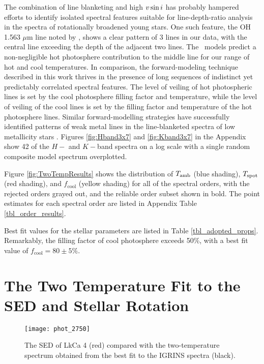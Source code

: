 \documentclass[twocolumn]{emulateapj}%
\begin{document}
The combination of line blanketing and high $v \sin i$ has probably hampered efforts to identify isolated spectral features suitable for line-depth-ratio analysis in the spectra of rotationally broadened young stars.  One such feature, the OH 1.563 $\mu$m line noted by \citet{oneal01}, shows a clear pattern of 3 lines in our data, with the central line exceeding the depth of the adjacent two lines.  The \PHOENIX\ models predict a non-negligible hot photosphere contribution to the middle line for our range of hot and cool temperatures.  In comparison, the forward-modeling technique described in this work thrives in the presence of long sequences of indistinct yet predictably correlated spectral features.  The level of veiling of hot photospheric lines is set by the cool photosphere filling factor and temperature, while the level of veiling of the cool lines is set by the filling factor and temperature of the hot photosphere lines. Similar forward-modelling strategies have successfully identified patterns of weak metal lines in the line-blanketed spectra of low metallicity stars \citep{kirby11,kirby15}.  Figures \ref{fig:Hband3x7} and \ref{fig:Kband3x7} in the Appendix show 42 of the $H-$ and $K-$band spectra on a log scale with a single random composite model spectrum overplotted.  

Figure \ref{fig:TwoTempResults} shows the distribution of $T_\textrm{amb}$ (blue shading), $T_\textrm{spot}$ (red shading), and $f_{\mathrm{cool}}$ (yellow shading) for all of the spectral orders, with the rejected orders grayed out, and the reliable order subset shown in bold.  The point estimates for each spectral order are listed in Appendix Table \ref{tbl_order_results}.

Best fit values for the stellar parameters are listed in Table \ref{tbl_adopted_props}.  Remarkably, the filling factor of cool photosphere exceeds 50\%, with a best fit value of $f_{\mathrm{cool}}=80\pm 5 \% $.




\section{The Two Temperature Fit to the SED and Stellar Rotation}\label{sec:GJHsection4}

\begin{figure}
 \centering
 \texttt{[image: phot\_2750]}
\caption{The SED of LkCa 4 (red) compared with the two-temperature spectrum obtained from the best fit to the IGRINS spectra (black).}
\label{fig:sed}
\end{figure}
\end{document}
